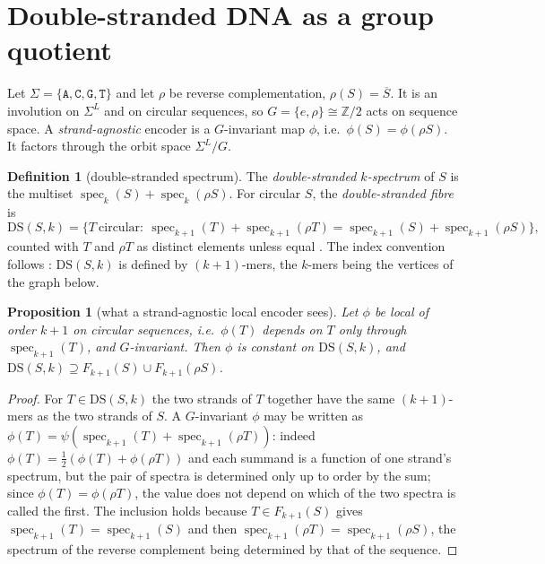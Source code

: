 \documentclass[11pt]{article}
\theoremstyle{plain}
\newtheorem{proposition}[theorem]{Proposition}
\theoremstyle{definition}
\newtheorem{definition}[theorem]{Definition}
\theoremstyle{remark}
\newcommand{\spec}{\operatorname{spec}}
\newcommand{\DS}{\mathrm{DS}}
\begin{document}
\section{Double-stranded DNA as a group quotient}\label{sec:dna}

Let $\Sigma=\{\mathtt A,\mathtt C,\mathtt G,\mathtt T\}$ and let $\rho$ be reverse complementation,
$\rho(S)=\overline{S}$. It is an involution on $\Sigma^L$ and on circular sequences, so $G=\{e,\rho\}\cong\mathbb Z/2$
acts on sequence space. A \emph{strand-agnostic} encoder is a $G$-invariant map $\phi$, i.e.\ $\phi(S)=\phi(\rho S)$.
It factors through the orbit space $\Sigma^L/G$.

\begin{definition}[double-stranded spectrum]\label{def:dsspec}
The \emph{double-stranded $k$-spectrum} of $S$ is the multiset $\spec_k(S)+\spec_k(\rho S)$. For circular $S$, the
\emph{double-stranded fibre} is
\[
\DS(S,k)=\{T\ \text{circular}:\ \spec_{k+1}(T)+\spec_{k+1}(\rho T)=\spec_{k+1}(S)+\spec_{k+1}(\rho S)\},
\]
counted with $T$ and $\rho T$ as distinct elements unless equal \cite[Def.~7.3]{AG}. The index convention follows
\cite{AG}: $\DS(S,k)$ is defined by $(k+1)$-mers, the $k$-mers being the vertices of the graph below.
\end{definition}

\begin{proposition}[what a strand-agnostic local encoder sees]\label{prop:dslocal}
Let $\phi$ be local of order $k+1$ on circular sequences, i.e.\ $\phi(T)$ depends on $T$ only through
$\spec_{k+1}(T)$, and $G$-invariant. Then $\phi$ is constant on $\DS(S,k)$, and $\DS(S,k)\supseteq F_{k+1}(S)\cup F_{k+1}(\rho S)$.
\end{proposition}

\begin{proof}
For $T\in\DS(S,k)$ the two strands of $T$ together have the same $(k+1)$-mers as the two strands of $S$. A
$G$-invariant $\phi$ may be written as $\phi(T)=\psi(\spec_{k+1}(T)+\spec_{k+1}(\rho T))$: indeed
$\phi(T)=\tfrac12(\phi(T)+\phi(\rho T))$ and each summand is a function of one strand's spectrum, but the pair of
spectra is determined only up to order by the sum; since $\phi(T)=\phi(\rho T)$, the value does not depend on which
of the two spectra is called the first. The inclusion holds because $T\in F_{k+1}(S)$ gives $\spec_{k+1}(T)=\spec_{k+1}(S)$
and then $\spec_{k+1}(\rho T)=\spec_{k+1}(\rho S)$, the spectrum of the reverse complement being determined by that of
the sequence.
\end{proof}
\end{document}
